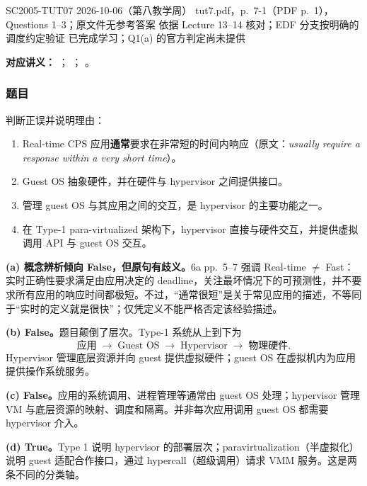 
\label{tutorial:SC2005-TUT07}

\tutorialmeta
  {SC2005-TUT07}
  {2026-10-06（第八教学周）}
  {tut7.pdf，p.~7-1（PDF p.~1），Questions 1--3；原文件无参考答案}
  {依据 Lecture 13--14 核对；EDF 分支按明确的调度约定验证}
  {已完成学习；Q1(a) 的官方判定尚未提供}

\nopagebreak[4]

\textbf{对应讲义：}
；
；
。

\subsubsection*{题目}

判断正误并说明理由：
\begin{enumerate}[label=(\alph*)]
  \item Real-time CPS 应用\textbf{通常}要求在非常短的时间内响应（原文：\emph{usually require a response within a very short time}）。
  \item Guest OS 抽象硬件，并在硬件与 hypervisor 之间提供接口。
  \item 管理 guest OS 与其应用之间的交互，是 hypervisor 的主要功能之一。
  \item 在 Type-1 para-virtualized 架构下，hypervisor 直接与硬件交互，并提供虚拟调用 API 与 guest OS 交互。
\end{enumerate}

\begin{checkedsolution}
\nopagebreak[4]
\textbf{(a) 概念辨析倾向 False，但原句有歧义。}6a pp.~5--7 强调 Real-time $\ne$ Fast：实时正确性要求满足由应用决定的 deadline，关注最坏情况下的可预测性，并不要求所有应用的响应时间都极短。不过，“通常很短”是关于常见应用的描述，不等同于“实时的定义就是很快”；仅凭定义不能严格否定该经验描述。

\textbf{(b) False。}题目颠倒了层次。Type-1 系统从上到下为
\[
  \text{应用}\;\longrightarrow\;\text{Guest OS}\;
  \longrightarrow\;\text{Hypervisor}\;\longrightarrow\;\text{物理硬件}.
\]
Hypervisor 管理底层资源并向 guest 提供虚拟硬件；guest OS 在虚拟机内为应用提供操作系统服务。

\textbf{(c) False。}应用的系统调用、进程管理等通常由 guest OS 处理；hypervisor 管理 VM 与底层资源的映射、调度和隔离。并非每次应用调用 guest OS 都需要 hypervisor 介入。

\textbf{(d) True。}Type 1 说明 hypervisor 的部署层次；paravirtualization（半虚拟化）说明 guest 适配合作接口，通过 hypercall（超级调用）请求 VMM 服务。这是两条不同的分类轴。
\end{checkedsolution}

